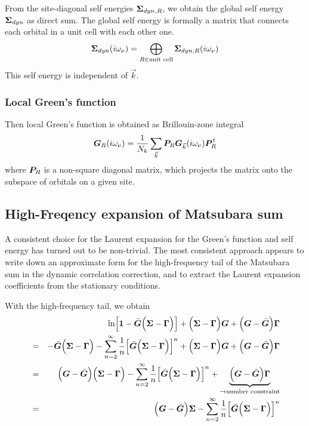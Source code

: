 \documentclass[11pt,a4paper]{report}
\begin{document}
From the site-diagonal self energies $\bm{\Sigma}_{dyn,R}$, we obtain
the global self energy $\bm{\Sigma}_{dyn}$ as direct sum. The global
self energy is formally a matrix that connects each orbital in a unit
cell with each other one.
\begin{eqnarray}
\bm{\Sigma}_{dyn}(i\omega_\nu)=\bigoplus_{R\in\text{unit cell}}
\bm{\Sigma}_{dyn,R}(i\omega_\nu)
\label{eq:sigmafromlocal}
\end{eqnarray}
This self energy is independent of $\vec{k}$.


\subsubsection{Local Green's function}
Then local Green's function is obtained as Brillouin-zone integral
\begin{eqnarray}
\bm{G}_{R}(i\omega_\nu)
=\frac{1}{N_k}\sum_{\vec{k}}\bm{P}_R\bm{G}_{\vec{k}}(i\omega_\nu)
\bm{P}^\dagger_R
\label{eq:deflocalgreen}
\end{eqnarray}
where $\bm{P}_R$ is a non-square diagonal matrix, which projects the
matrix onto the subspace of orbitals on a given site.




\subsection{High-Freqency expansion of Matsubara sum}
A consistent choice for the Laurent expansion for the Green's function
and self energy has turned out to be non-trivial. The most consistent
approach appears to write down an approximate form for the
high-frequency tail of the Matsubara sum in the dynamic correlation
correction, and to extract the Laurent expansion coefficients from the
stationary conditions.

With the high-frequency tail, we obtain
\begin{eqnarray}
&&\ln\Bigl[\mat{1}-\bar{\mat{G}}\Bigl(\mat{\Sigma}-\mat{\Gamma}\Bigr)\Bigr]
+\Bigl(\mat{\Sigma}-\mat{\Gamma}\Bigr)\mat{G}
+\Bigl(\mat{G}-\bar{\mat{G}}\Bigr)\mat{\Gamma}
%
\nonumber\\
&=&-\bar{\mat{G}}\Bigl(\mat{\Sigma}-\mat{\Gamma}\Bigr)
-\sum_{n=2}^\infty\frac{1}{n}
\Bigl[\bar{\mat{G}}\Bigl(\mat{\Sigma}-\mat{\Gamma}\Bigr)\Bigr]^n
+\Bigl(\mat{\Sigma}-\mat{\Gamma}\Bigr)\mat{G}
+\Bigl(\mat{G}-\bar{\mat{G}}\Bigr)\mat{\Gamma}
%
\nonumber\\
&=&\Bigl(\mat{G}-\bar{\mat{G}}\Bigr)
\Bigl(\mat{\Sigma}-\mat{\Gamma}\Bigr)
-\sum_{n=2}^\infty\frac{1}{n}
\Bigl[\bar{\mat{G}}\Bigl(\mat{\Sigma}-\mat{\Gamma}\Bigr)\Bigr]^n
+\underbrace{\Bigl(\mat{G}-\bar{\mat{G}}\Bigr)\mat{\Gamma}}
_{\rightarrow\text{number constraint}}
%
\nonumber\\
&=&\Bigl(\mat{G}-\bar{\mat{G}}\Bigr)\mat{\Sigma}
-\sum_{n=2}^\infty\frac{1}{n}
\Bigl[\bar{\mat{G}}\Bigl(\mat{\Sigma}-\mat{\Gamma}\Bigr)\Bigr]^n
\label{eq:startingpointmatsubara}
\end{eqnarray}
\end{document}
